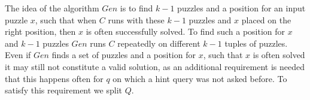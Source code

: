 The idea of the algorithm $Gen$ is to find $k-1$ puzzles and a position for an input puzzle $x$, such that
when $C$ runs with these $k-1$ puzzles and $x$ placed on the right position, then $x$ is often successfully solved.
To find such a position for $x$ and $k-1$ puzzles $Gen$ runs $C$ repeatedly on different $k-1$ tuples of puzzles.
Even if $Gen$ finds a set of puzzles and a position for $x$, such that $x$ is often solved it may still not
constitute a valid solution, as an additional requirement is needed that this happens often for $q$
on which a hint query was not asked before. To satisfy this requirement we split $Q$.
